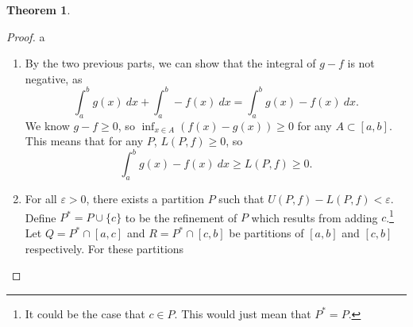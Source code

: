 \documentclass{article}
\def\upint{\mathchoice%
	{\mkern13mu\overline{\vphantom{\intop}\mkern7mu}\mkern-20mu}%
	{\mkern7mu\overline{\vphantom{\intop}\mkern7mu}\mkern-14mu}%
	{\mkern7mu\overline{\vphantom{\intop}\mkern7mu}\mkern-14mu}%
	{\mkern7mu\overline{\vphantom{\intop}\mkern7mu}\mkern-14mu}%
	\int}
\def\lowint{\mkern3mu\underline{\vphantom{\intop}\mkern7mu}\mkern-10mu\int}
\theoremstyle{definition}
\newtheorem{theorem}{Theorem}[section]
\begin{document}
\begin{theorem}
\begin{proof}{\color{white}a}
\begin{enumerate}
\begin{align*}
 	\end{align*}
 	This gives
 	\begin{align*}
 		\upint_a^bf(x)\ dx= \inf\limits_{P\in\textbf{P}([a,b])}U(P,cf)=c\inf\limits_{P\in\textbf{P}([a,b])}U(P,f)=c\upint_a^bf(x)\ dx,\\\lowint_a^bf(x)\ dx= \sup\limits_{P\in\textbf{P}([a,b])}L(P,cf)=c\inf\limits_{P\in\textbf{P}([a,b])}L(P,f)=c\lowint_a^bf(x)\ dx.
 	\end{align*}
 	 Since $ f $ is Riemann integrable, its upper and lower Riemann integrals are equal. This establishes the integrability of $ f $, as $$ c\lowint_a^bf(x)\ dx=c\upint_a^bf(x)\ dx=c\int_a^bf(x)\ dx.$$
 	 
 	 Now let $ c=-1 $. In this case, we can't ``factor'' out a constant from a supremum and infimum. Instead, for any $ A\subset[a,b] $, we have
 	 \begin{align*}
 	 \sup\limits_{x\in A} -f(x)=-\inf\limits_{x\in A} f(x),\\\inf\limits_{x\in A} -f(x)=-\sup\limits_{x\in A} f(x).
 	 \end{align*}
 	 We will have $ U(P,-f)=-L(P,f) $ and $ L(P,-f)=-U(P,f) $ for any partition. This gives
 	 \begin{align*}
 	 \upint_a^b-f(x)\ dx= \inf\limits_{P\in\textbf{P}([a,b])}U(P,-f)=\inf\limits_{P\in\textbf{P}([a,b])}-L(P,f)=-\sup\limits_{P\in\textbf{P}([a,b])}L(P,f)=-\lowint_a^bf(x)\ dx,\\\lowint_a^b-f(x)\ dx= \sup\limits_{P\in\textbf{P}([a,b])}L(P,-f)=\sup\limits_{P\in\textbf{P}([a,b])}-U(P,f)=-\inf\limits_{P\in\textbf{P}([a,b])}U(P,f)=-\upint_a^bf(x)\ dx. 	 \end{align*}
 	 Since $ f $ is Riemann integrable, its negative upper and lower Riemann integrals are equal, so $$ \lowint_a^b-f(x)\ dx=c\upint_a^b-f(x)\ dx=c\int_a^b-f(x)\ dx. $$
 	 In general, if $ c<0 $, we can write it as $ -1\cdot|c| $ and apply the first two cases. 
	\item By the two previous parts, we can show that the integral of $ g-f $ is not negative, as $$ \int_{a}^{b}g(x)\ dx+\int_{a}^{b}-f(x)\ dx=\int_{a}^{b}g(x)-f(x)\ dx.$$ We know $ g-f\ge 0 $, so $ \inf_{x\in A}(f(x)-g(x))\ge 0 $ for any $ A\subset [a,b] $.  This means that for any $ P $, $ L(P,f)\ge 0 $, so $$ \int_{a}^{b}g(x)-f(x)\ dx\ge L(P,f)\ge 0.$$
	\item For all $ \varepsilon>0 $, there exists a partition $ P $ such that $ U(P,f)-L(P,f)<\varepsilon $. Define $ P^*=P\cup\{c\} $ to be the refinement of $ P $ which results from adding $ c $.\footnote{It could be the case that $ c\in P $. This would just mean that $ P^*=P $.} Let $ Q=P^*\cap[a,c] $ and $ R=P^*\cap[c,b] $ be partitions of $ [a,b] $ and $ [c,b] $ respectively. For these partitions 

\end{enumerate}
\end{proof}
\end{theorem}
\end{document}
